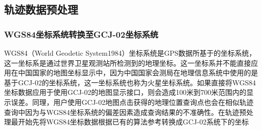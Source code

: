 



\subsection{轨迹数据预处理}
\label{subsec:preprocess}

\subsubsection{WGS84坐标系统转换至GCJ-02坐标系统}
\label{subsubsec:coord-transform}
WGS84（World Geodetic System1984）坐标系统是GPS数据所基于的坐标系统，这一坐标系是通过世界卫星观测站所检测到的地理坐标。这一坐标系并不能直接应用在中国国家的地图坐标显示中，因为中国国家会测局在地理信息系统中使用的是基于GCJ-02的坐标系统，这一坐标系统也称为火星坐标系统。如果直接将WGS84坐标数据应用于使用GCJ-02的地图显示接口，则会造成100米到700米范围内的显示误差。同理，用户使用GCJ-02地图点击获得的地理位置查询点也会在相似轨迹查询中因为与WGS84坐标系统的偏差因素造成查询结果的不准确性。在轨迹预处理最开始先将WGS84坐标数据根据已有的算法\footnotemark[1]参考转换成GCJ-02系统下的坐标


